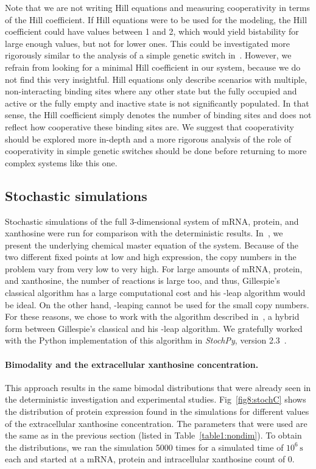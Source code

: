 \documentclass[10pt,letterpaper]{article}
\newcommand{\unit}[1]{\,\mathrm{#1}}
\begin{document}
Note that we are not writing Hill equations and measuring cooperativity in
terms of the Hill coefficient. If Hill equations were to be used for the
modeling, the Hill coefficient could have values between 1 and 2, which
would yield bistability for large enough values, but not for lower ones.
This could be investigated more rigorously similar to the analysis of a
simple genetic switch in~\cite{Cherry2000}. However, we refrain from looking
for a minimal Hill coefficient in our system, because we do not find this
very insightful. Hill equations only describe scenarios with multiple,
non-interacting binding sites where any other state but the fully occupied
and active or the fully empty and inactive state is not significantly
populated. In that sense, the Hill coefficient simply denotes the number of
binding sites and does not reflect how cooperative these binding sites are.
We suggest that cooperativity should be explored more in-depth and a more
rigorous analysis of the role of cooperativity in simple genetic switches
should be done before returning to more complex systems like this one.

\subsection*{Stochastic simulations}
Stochastic simulations of the full 3-dimensional system of mRNA, protein,
and xanthosine were run for comparison with the deterministic results.
In~, we present the underlying chemical master equation of
the system. Because of the two different fixed points at low and high
expression, the copy numbers in the problem vary from very low to very high.
For large amounts of mRNA, protein, and xanthosine, the number of reactions
is large too, and thus, Gillespie's classical algorithm has a large
computational cost and his \texttau-leap algorithm would be ideal. On the
other hand, \texttau-leaping cannot be used for the small copy numbers. For
these reasons, we chose to work with the algorithm described
in~\cite{Cao2006}, a hybrid form between Gillespie's classical and his
\texttau-leap algorithm. We gratefully worked with the Python implementation
of this algorithm in \emph{StochPy}, version 2.3~\cite{Maarleveld2015}.

\paragraph*{Bimodality and the extracellular xanthosine concentration.}
This approach results in the same bimodal distributions that were already
seen in the deterministic investigation and experimental studies.
Fig~\ref{fig8:stochC} shows the distribution of protein expression found in
the simulations for different values of the extracellular xanthosine
concentration. The parameters that were used are the same as in the previous
section (listed in Table~\ref{table1:nondim}). To obtain the distributions,
we ran the simulation 5000 times for a simulated time of $10^6 \unit{s}$
each and started at a mRNA, protein and intracellular xanthosine count of 0.
\end{document}
